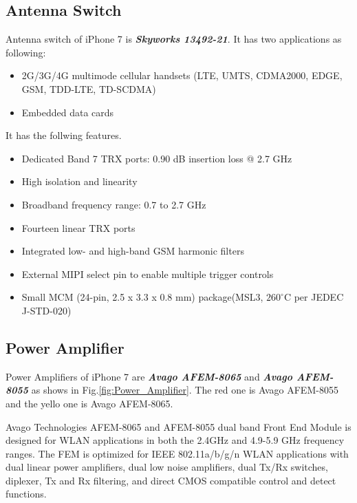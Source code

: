 \documentclass[conference]{IEEEtran}
\begin{document}
\subsection{Antenna Switch}
Antenna switch of iPhone 7 is {\bfseries{\emph{Skyworks 13492-21}}}. It has two applications as following:
\begin{itemize}
	\item 2G/3G/4G multimode cellular handsets (LTE, UMTS, CDMA2000,
	EDGE, GSM, TDD-LTE, TD-SCDMA)
	\item Embedded data cards 
\end{itemize}
It has the follwing features\cite{antenna_switch.org}.
\begin{itemize}
	\item Dedicated Band 7 TRX ports: 0.90 dB insertion loss @ 2.7 GHz 
	\item High isolation and linearity 
	\item Broadband frequency range: 0.7 to 2.7 GHz 
	\item Fourteen linear TRX ports
	\item Integrated low- and high-band GSM harmonic filters
	\item External MIPI select pin to enable multiple trigger controls 
	\item Small MCM (24-pin, 2.5 x 3.3 x 0.8 mm) package(MSL3, $260^{\circ}$C per JEDEC J-STD-020) 
\end{itemize}

\subsection{Power Amplifier}
Power Amplifiers of iPhone 7 are {\bfseries{\emph{Avago AFEM-8065}}} and {\bfseries{\emph{Avago AFEM-8055}}} as shows in Fig.\ref{fig:Power_Amplifier}. The red one is Avago AFEM-8055 and the yello one is Avago AFEM-8065.

Avago Technologies AFEM-8065 and AFEM-8055 dual band Front End Module is designed for WLAN applications in both the 2.4GHz and 4.9-5.9 GHz frequency ranges. The FEM is optimized for IEEE 802.11a/b/g/n WLAN applications with dual linear power amplifiers, dual low noise amplifiers, dual Tx/Rx switches, diplexer, Tx and Rx filtering, and direct CMOS compatible control and detect functions. 
\end{document}
